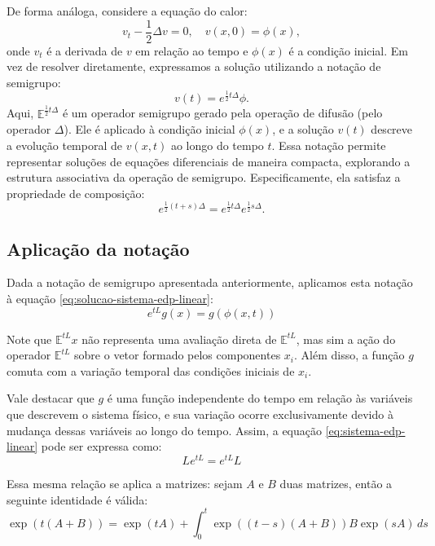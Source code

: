 \documentclass[12pt]{article}
\begin{document}
De forma análoga, considere a equação do calor:
\begin{equation*}
	v_t - \frac{1}{2} \Delta v = 0, \quad v(x, 0) = \phi(x),
\end{equation*}
onde $v_t$ é a derivada de $v$ em relação ao tempo e $\phi(x)$ é a condição inicial. Em vez de resolver diretamente, expressamos a solução utilizando a notação de semigrupo:
\begin{equation*}
	v(t) = e^{\frac{1}{2}t \Delta} \phi.
\end{equation*}
Aqui, $\mathbb{E}^{\frac{1}{2}t \Delta}$ é um operador semigrupo gerado pela operação de difusão (pelo operador $\Delta$). Ele é aplicado à condição inicial $\phi(x)$, e a solução $v(t)$ descreve a evolução temporal de $v(x,t)$ ao longo do tempo $t$. Essa notação permite representar soluções de equações diferenciais de maneira compacta, explorando a estrutura associativa da operação de semigrupo. Especificamente, ela satisfaz a propriedade de composição:
\begin{equation*}
	e^{\frac{1}{2}(t+s)\Delta} = e^{\frac{1}{2}t \Delta} e^{\frac{1}{2}s \Delta}.
\end{equation*}

\subsection{Aplicação da notação}
Dada a notação de semigrupo apresentada anteriormente, aplicamos esta notação à equação \eqref{eq:solucao-sistema-edp-linear}:
\begin{equation}
	e^{tL}g(x) = g(\phi(x,t))
	\label{eq:solucao-sistema-edp-linear-semigrupo}
\end{equation}

Note que $\mathbb{E}^{tL}x$ não representa uma avaliação direta de $\mathbb{E}^{tL}$, mas sim a ação do operador $\mathbb{E}^{tL}$ sobre o vetor formado pelos componentes $x_i$. Além disso, a função $g$ comuta com a variação temporal das condições iniciais de $x_i$. 

Vale destacar que $g$ é uma função independente do tempo em relação às variáveis que descrevem o sistema físico, e sua variação ocorre exclusivamente devido à mudança dessas variáveis ao longo do tempo. Assim, a equação \eqref{eq:sistema-edp-linear} pode ser expressa como:
\begin{equation}
	Le^{tL} = e^{tL}L
\end{equation}

Essa mesma relação se aplica a matrizes: sejam $A$ e $B$ duas matrizes, então a seguinte identidade é válida:
\begin{equation}
	\exp(t(A+B)) = \exp(tA) + \int_0^t \exp\left((t-s)(A+B)\right)B\exp(sA) \, ds
	\label{eq:formula-de-duhamel}
\end{equation}
\end{document}
